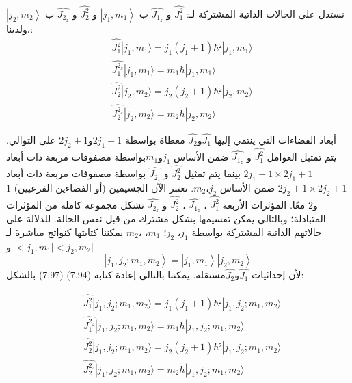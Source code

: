 نستدل على الحالات الذاتية المشتركة لـ: 
$\hat{J^{2}_1}$
و $\hat{J_{1_z}}$  ب  $  \left|j_1, m_1\right\rangle$    
و  $\hat{J^{2}_2}$
و $\hat{J_{2_z}}$  ب  $  \left|j_2, m_2\right\rangle$ 
،ولدينا:
\begin{equation}
	\begin{aligned}
	      &   \hat{J^{2}_1}|j_1, m_1\rangle =j_1(j_1+1)\hbar²|j_1, m_1\rangle\\
	&\hat{J^{2_z}_1}|j_1, m_1\rangle =m_1\hbar|j_1, m_1\rangle\\
&	\hat{J^{2}_2}|j_2, m_2\rangle =j_2(j_2+1)\hbar²|j_2, m_2\rangle\\
&	\hat{J^{2_z}_2}|j_2, m_2\rangle =m_2\hbar|j_2, m_2\rangle
	\end{aligned}
\end{equation}

أبعاد الفضاءات التي ينتمي إليها $\hat{J_1}$و$\hat{J_2}$ معطاة بواسطة $2j_1+1 $و$ 2j_2+1$
على التوالي. يتم تمثيل العوامل
 $\hat{J^{2}_1}$
و $\hat{J_{1_z}}$  ضمن الأساس $j_1 $و$m_1 $بواسطة مصفوفات مربعة ذات أبعاد 
$2j_1+1 × 2j_1+1$
 بينما يتم تمثيل
 $\hat{J^{2}_2}$
و $\hat{J_{2_z}}$   بواسطة مصفوفات مربعة ذات أبعاد
 $2j_2 +1 × 2j_2+1 $
 ضمن الأساس 
$j_2$،$m_2$.  
نعتبر الآن الجسيمين (أو الفضاءين الفرعيين) 1 و2 معًا. المؤثرات الأربعة $\hat{J^{2}_1}$
، $\hat{J_{1_z}}$  ، $\hat{J^{2}_2}$
و $\hat{J_{2_z}}$   تشكل مجموعة كاملة من المؤثرات المتبادلة؛ وبالتالي يمكن تقسيمها بشكل مشترك من قبل نفس الحالة. للدلالة على حالاتهم الذاتية المشتركة بواسطة
 $j_1$، $ j_2$؛ $m_1$، $m_2، $
 يمكننا كتابتها كنواتج مباشرة لـ $<j_1,m_1 |$ و$ <j_2, m_2 |$
\begin{equation}
	\left|j_1, j_2 ; m_1, m_2\right\rangle=	\left|j_1,m_1\right\rangle	\left| j_2, m_2\right\rangle
\end{equation}
لأن إحداثيات $\hat{J_1}$و$\hat{J_2}$مستقلة. يمكننا بالتالي إعادة كتابة (7.94)-(7.97) بالشكل:


\begin{equation}
	\begin{aligned}
		&   \hat{J^{2}_1}|j_1, j_2 ; m_1, m_2\rangle =j_1(j_1+1)\hbar²|j_1, j_2 ; m_1, m_2\rangle\\
		&\hat{J^{2_z}_1}|j_1, j_2 ; m_1, m_2\rangle =m_1\hbar|j_1, j_2 ; m_1, m_2\rangle\\
		&	\hat{J^{2}_2}|j_1, j_2 ; m_1, m_2\rangle =j_2(j_2+1)\hbar²|j_1, j_2 ; m_1, m_2\rangle\\
		&	\hat{J^{2_z}_2}|j_1, j_2 ; m_1, m_2\rangle =m_2\hbar|j_1, j_2 ; m_1, m_2\rangle
	\end{aligned}
\end{equation}

